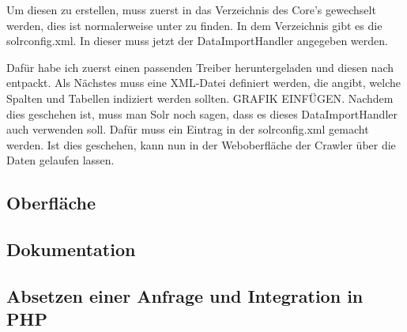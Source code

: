 Um diesen zu erstellen, muss zuerst in das Verzeichnis des Core’s gewechselt werden, dies ist normalerweise unter  zu finden. In dem Verzeichnis gibt es die solrconfig.xml. In dieser muss jetzt der DataImportHandler angegeben werden. \cite{solrref.2019b}

Dafür habe ich zuerst einen passenden Treiber heruntergeladen und diesen nach  entpackt. Als Nächstes muss eine XML-Datei definiert werden, die angibt, welche Spalten und Tabellen indiziert werden sollten. {GRAFIK EINFÜGEN}. Nachdem dies geschehen ist, muss man Solr noch sagen, dass es dieses DataImportHandler auch verwenden soll. Dafür muss ein Eintrag in der solrconfig.xml gemacht werden. Ist dies geschehen, kann nun in der Weboberfläche der Crawler über die Daten gelaufen lassen.
\cite{IqubalMustafaKaki.2016}

\subsection{Oberfläche}

\subsection{Dokumentation}

\subsection{Absetzen einer Anfrage und Integration in PHP}